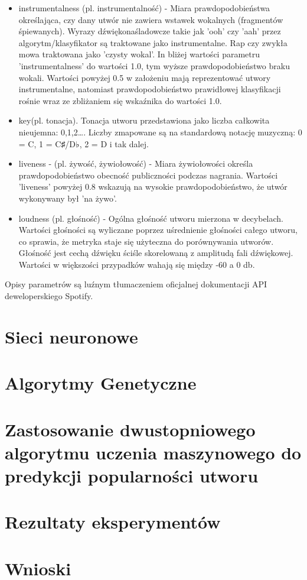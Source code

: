 \documentclass[a4paper,11pt]{article}
\begin{document}
\begin{itemize}
        \item instrumentalness (pl. instrumentalność) - Miara prawdopodobieństwa określająca, czy dany utwór nie zawiera wstawek wokalnych (fragmentów śpiewanych). Wyrazy dźwiękonaśladowcze takie jak 'ooh' czy 'aah' przez algorytm/klasyfikator są traktowane jako instrumentalne. Rap czy zwykła mowa traktowana jako 'czysty wokal'. In bliżej wartości parametru 'instrumentalness' do wartości 1.0, tym wyższe prawdopodobieństwo braku wokali. Wartości powyżej 0.5 w założeniu mają reprezentować utwory instrumentalne, natomiast prawdopodobieństwo prawidłowej klasyfikacji rośnie wraz ze zbliżaniem się wskaźnika do wartości 1.0.
        \item key(pl. tonacja). Tonacja utworu przedstawiona jako liczba całkowita nieujemna: 0,1,2\ldots . Liczby zmapowane są na standardową notację muzyczną: 0 = C, 1 = C♯/D♭, 2 = D i tak dalej.
        \item liveness - (pl. żywość, żywiołowość) - Miara żywiołowości określa prawdopodobieństwo obecność publiczności podczas nagrania. Wartości 'liveness' powyżej 0.8 wskazują na wysokie prawdopodobieństwo, że utwór wykonywany był 'na żywo'.
        \item loudness (pl. głośność) - Ogólna głośność utworu mierzona w decybelach. Wartości głośności są wyliczane poprzez uśrednienie głośności całego utworu, co sprawia, że metryka staje się użyteczna do porównywania utworów. Głośność jest cechą dźwięku ściśle skorelowaną z amplitudą fali dźwiękowej. Wartości w większości przypadków wahają się między -60 a 0 db.
    \end{itemize}
    Opisy parametrów są luźnym tłumaczeniem oficjalnej dokumentacji API deweloperskiego Spotify.


    \section{Sieci neuronowe}


    \section{Algorytmy Genetyczne}


    \section{Zastosowanie dwustopniowego algorytmu uczenia maszynowego do predykcji popularności utworu}


    \section{Rezultaty eksperymentów}


    \section{Wnioski}
\end{document}
